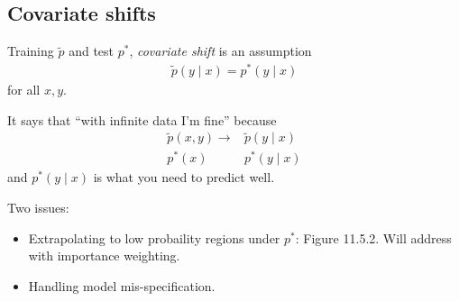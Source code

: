 \subsection{Covariate shifts}

Training $\tilde{p}$ and test $p^*$,
\emph{covariate shift} is an assumption
\begin{align}
  \tilde{p}(y \mid x) = p^*(y \mid x)
\end{align}
for all $x, y$.

It says that ``with infinite data I'm fine'' because
\begin{align}
  \tilde{p}(x,y) \to &\tilde{p}(y \mid x) \\
  p^*(x) \quad& p^*(y \mid x)
\end{align}
and $p^*(y \mid x)$ is what you need to predict well.

Two issues:
\begin{itemize}
  \item Extrapolating to low probaility regions under $p^*$: Figure 11.5.2.
    Will address with importance weighting.
  \item Handling model mis-specification.

\end{itemize}
